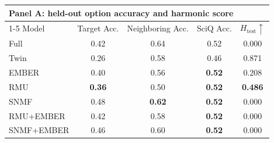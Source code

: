 \begin{table}[t]
  \centering
  \scriptsize
  \begin{tabular}{lcccc}
    \toprule
    \multicolumn{5}{l}{\textbf{Panel A: held-out option accuracy and harmonic score}} \\
    \cmidrule(lr){1-5}
    Model & Target Acc. & Neighboring Acc. & SciQ Acc. & $H_{\mathrm{test}}\uparrow$ \\
    \midrule
    Full  & 0.42 & 0.64 & 0.52 & 0.000 \\
    Twin  & 0.26 & 0.58 & 0.46 & 0.871 \\
    EMBER & 0.40 & 0.56 & \textbf{0.52} & 0.208 \\
    RMU   & \textbf{0.36} & 0.50 & \textbf{0.52} & \textbf{0.486} \\
    SNMF  & 0.48 & \textbf{0.62} & \textbf{0.52} & 0.000 \\
    RMU+EMBER & 0.42 & 0.58 & \textbf{0.52} & 0.000 \\
    SNMF+EMBER & 0.46 & 0.60 & \textbf{0.52} & 0.000 \\
    \bottomrule
  \end{tabular}


\end{table}
